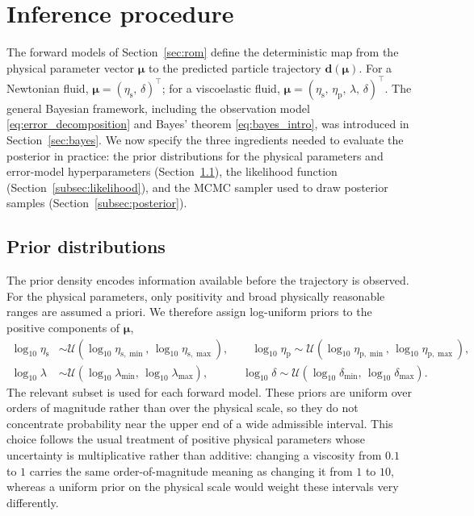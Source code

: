 \documentclass{elsarticle}
\renewcommand{\vec}[1]{\boldsymbol{#1}}
\newcommand{\params}{\boldsymbol{\mu}}
\begin{document}
\section{Inference procedure}
\label{sec:bayesian_inference}

The forward models of Section~\ref{sec:rom} define the deterministic map
from the physical parameter vector $\params$ to the predicted particle
trajectory $\vec{d}(\params)$. For a Newtonian fluid,
$\params = (\eta_{\mathrm{s}},\,\delta)^{\top}$; for a viscoelastic
fluid,
$\params = (\eta_{\mathrm{s}},\,\eta_{\mathrm{p}},\,\lambda,\,\delta)^{\top}$.
The general Bayesian framework, including the observation model
\eqref{eq:error_decomposition} and Bayes' theorem
\eqref{eq:bayes_intro}, was introduced in Section~\ref{sec:bayes}. We
now specify the three ingredients needed to evaluate the posterior in
practice: the prior distributions for the physical parameters and
error-model hyperparameters (Section~\ref{subsec:priors}), the
likelihood function (Section~\ref{subsec:likelihood}), and the MCMC
sampler used to draw posterior samples (Section~\ref{subsec:posterior}).

\subsection{Prior distributions}
\label{subsec:priors}

The prior density encodes information available before the trajectory is
observed. For the physical parameters, only positivity and broad
physically reasonable ranges are assumed a priori. We therefore assign
log-uniform priors to the positive components of $\params$,
\begin{equation}
\begin{aligned}
\log_{10}\eta_{\mathrm{s}} &\sim
\mathcal{U}(\log_{10}\eta_{\mathrm{s},\min},\,
            \log_{10}\eta_{\mathrm{s},\max}),
\qquad
\log_{10}\eta_{\mathrm{p}} \sim
\mathcal{U}(\log_{10}\eta_{\mathrm{p},\min},\,
            \log_{10}\eta_{\mathrm{p},\max}),
\\
\log_{10}\lambda &\sim
\mathcal{U}(\log_{10}\lambda_{\min},\,\log_{10}\lambda_{\max}),
\qquad\quad
\log_{10}\delta  \sim
\mathcal{U}(\log_{10}\delta_{\min},\,\log_{10}\delta_{\max}).
\end{aligned}
\label{eq:priors_params}
\end{equation}
The relevant subset is used for each forward model. These priors are
uniform over orders of magnitude rather than over the physical scale, so
they do not concentrate probability near the upper end of a wide
admissible interval. This choice follows the usual treatment of positive
physical parameters whose uncertainty is multiplicative rather than
additive: changing a viscosity from $0.1$ to $1$ carries the same
order-of-magnitude meaning as changing it from $1$ to $10$, whereas a
uniform prior on the physical scale would weight these intervals very
differently.
\end{document}
